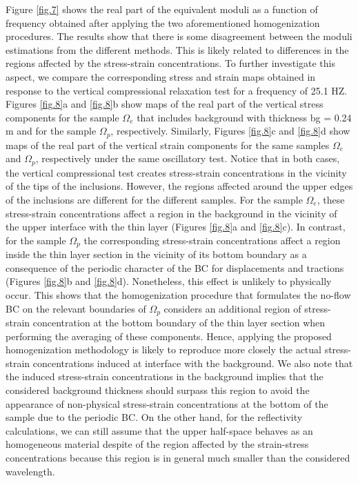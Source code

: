 \documentclass[draft]{agujournal2019}
\begin{document}
Figure \ref{fig.7} shows the real part of the  equivalent moduli as a function of frequency obtained after applying the two aforementioned homogenization procedures.
The results show that there is some disagreement between the moduli estimations from the different methods.
This is likely related to differences in the regions affected by the stress-strain concentrations. To further investigate this aspect, we compare the corresponding stress and strain maps obtained in response to the vertical compressional relaxation test for a frequency of 25.1 HZ. Figures \ref{fig.8}a and \ref{fig.8}b show maps of the real part of the vertical stress components for the sample $\Omega_e$ that includes background with thickness bg = 0.24 m and for the sample $\Omega_p$, respectively. Similarly, Figures \ref{fig.8}c and \ref{fig.8}d show maps of the real part of the vertical strain components for the same samples  $\Omega_e$ and $\Omega_p$, respectively under the same oscillatory test. Notice that in both cases, the vertical compressional test creates stress-strain concentrations in the vicinity of the tips of the inclusions. However, the regions affected around the upper edges of the inclusions are different for the different samples. For the sample $\Omega_e$, these stress-strain concentrations affect a region in the background in the vicinity of the upper interface with the thin layer (Figures \ref{fig.8}a and \ref{fig.8}c). In contrast, for the sample $\Omega_p$  the corresponding stress-strain concentrations affect a region inside the thin layer section in the vicinity of its bottom boundary as a consequence of the periodic character of the BC for displacements and tractions (Figures \ref{fig.8}b and \ref{fig.8}d). Nonetheless, this effect is unlikely to physically occur. This shows that the homogenization procedure that formulates the no-flow BC on the relevant boundaries of $\Omega_p$ considers an additional region of stress-strain concentration at the bottom boundary of the thin layer section when performing the averaging of these components. Hence, applying the proposed homogenization methodology is likely to reproduce more closely the actual stress-strain concentrations induced at interface with the background. We also note that the induced stress-strain concentrations in the background implies that the considered background thickness should surpass this region to avoid the appearance of non-physical stress-strain concentrations at the bottom of the sample due to the periodic BC. On the other hand, for the reflectivity calculations, we can still assume that the upper half-space behaves as an homogeneous material despite of the region affected by the strain-stress concentrations because this region is in general much smaller than the considered wavelength. 
\end{document}
